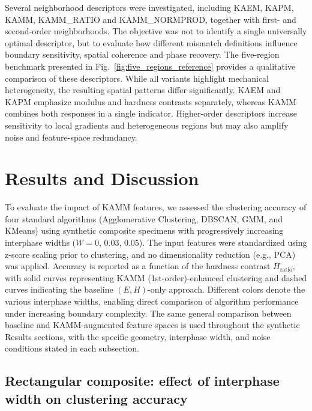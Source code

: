 \documentclass[final,3p,times]{elsarticle}
\begin{document}
Several neighborhood descriptors were investigated, including KAEM, KAPM, KAMM, KAMM\_RATIO and KAMM\_NORMPROD, together with first- and second-order neighborhoods. The objective was not to identify a single universally optimal descriptor, but to evaluate how different mismatch definitions influence boundary sensitivity, spatial coherence and phase recovery. The five-region benchmark presented in Fig.~\ref{fig:five_regions_reference} provides a qualitative comparison of these descriptors. While all variants highlight mechanical heterogeneity, the resulting spatial patterns differ significantly. KAEM and KAPM emphasize modulus and hardness contrasts separately, whereas KAMM combines both responses in a single indicator. Higher-order descriptors increase sensitivity to local gradients and heterogeneous regions but may also amplify noise and feature-space redundancy.

\section{Results and Discussion}
\label{sec:results}

To evaluate the impact of KAMM features, we assessed the clustering accuracy of four standard algorithms (Agglomerative Clustering, DBSCAN, GMM, and KMeans) using synthetic composite specimens with progressively increasing interphase widths ($W = 0$, $0.03$, $0.05$). The input features were standardized using z-score scaling prior to clustering, and no dimensionality reduction (e.g., PCA) was applied. Accuracy is reported as a function of the hardness contrast $H_\mathrm{ratio}$, with solid curves representing KAMM (1st-order)-enhanced clustering and dashed curves indicating the baseline $(E,H)$-only approach. Different colors denote the various interphase widths, enabling direct comparison of algorithm performance under increasing boundary complexity. The same general comparison between baseline and KAMM-augmented feature spaces is used throughout the synthetic Results sections, with the specific geometry, interphase width, and noise conditions stated in each subsection.

\subsection{Rectangular composite: effect of interphase width on clustering accuracy} \label{sec:results_interphasewidth}
\end{document}
